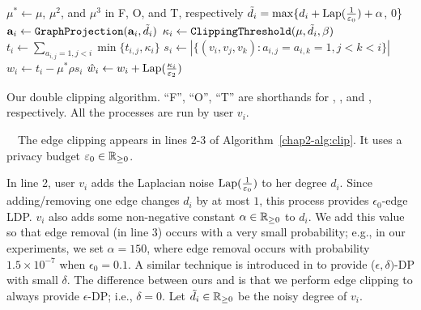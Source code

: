 \setlength{\algomargin}{5mm}
\begin{algorithm}[t]
  \SetAlgoLined
  $\mu^* \leftarrow \mu$, $\mu^2$, and $\mu^3$ in F, O, and T, respectively\;
  $\tilde{d}_i = \max\{d_i + \textrm{Lap}(\frac{1}{\varepsilon_0}) + \alpha$, 0\}\;
  $\mathbf{a}_i \leftarrow \texttt{GraphProjection}(\mathbf{a}_i, \tilde{d}_i)$\;
  $\kappa_i \leftarrow \texttt{ClippingThreshold}(\mu, \tilde{d}_i, \beta)$\;
  $t_i \leftarrow \sum_{a_{i,j} = 1, j<i} \min \{t_{i,j}, \kappa_i\}$\;
  $s_i \leftarrow |\{(v_i,v_j,v_k) : a_{i,j} = a_{i,k} = 1, j<k<i\}|$\;
  $w_i \leftarrow t_i - \mu^* \rho s_i$\;
  $\hat{w}_i \leftarrow w_i + \textrm{Lap}(\frac{\kappa_i}{\varepsilon_2})$\;
  \caption{Our double clipping algorithm. 
  ``F'', ``O'', ``T'' are shorthands for 
  \AlgOne{}, \AlgTwo{}, and \AlgThree{}, respectively.
  All the processes are run by user $v_i$.
  }\label{chap2-alg:clip}
\end{algorithm}

\smallskip
{}~~The edge clipping appears in lines 2-3 of Algorithm~\ref{chap2-alg:clip}. 
It uses a privacy budget $\varepsilon_0 \in \mathbb{R}_{\ge0}$. 

In line 2, user $v_i$ adds the Laplacian noise $\textrm{Lap}(\frac{1}{\varepsilon_0})$ to her degree $d_i$. 
Since adding/removing one edge changes $d_i$ by at most $1$, this process provides $\epsilon_0$-edge LDP. 
$v_i$ also adds some non-negative constant 
$\alpha \in \mathbb{R}_{\ge0}$ 
to $d_i$. 
We add this value so that edge removal (in line 3) occurs with a very small probability; 
e.g., in our experiments, we set $\alpha = 150$, where 
edge removal occurs with probability $1.5 \times 10^{-7}$ when $\epsilon_0 = 0.1$. 
A similar technique is introduced in \cite{Sun_CCS19} to provide ($\epsilon, \delta)$-DP \cite{DP} with small $\delta$. 
The difference between ours and \cite{Sun_CCS19} is that we perform edge clipping 
to always provide $\epsilon$-DP; i.e., $\delta = 0$.
Let $\tilde{d}_i \in \mathbb{R}_{\ge0}$ be the noisy degree of $v_i$.

